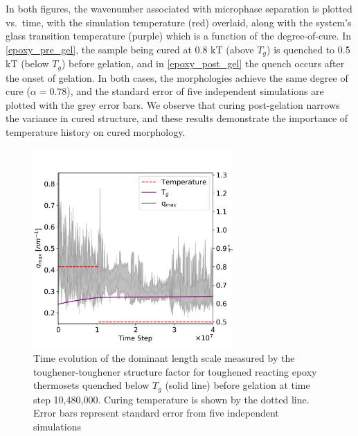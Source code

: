 In both figures, the wavenumber associated with microphase separation is plotted vs.~time, with the simulation temperature (red) overlaid, along with the system's glass transition temperature (purple) which is a function of the degree-of-cure. 
In \autoref{epoxy_pre_gel}, the sample being cured at 0.8 kT (above $T_g$) is quenched to 0.5 kT (below $T_g$) before gelation, and in \autoref{epoxy_post_gel} the quench occurs after the onset of gelation. 
In both cases, the morphologies achieve the same degree of cure ($\alpha=0.78$), and the standard error of five independent simulations are plotted with the grey error bars. 
We observe that curing post-gelation narrows the variance in cured structure, and these results demonstrate the importance of temperature history on cured morphology.

\begin{figure}
    \centering
    \includegraphics[width=3in]{figures/pub4/epoxy_pre_gel.png}
    \caption{Time evolution of the dominant length scale measured by the toughener-toughener structure factor for toughened reacting epoxy thermosets quenched below $T_g$ (solid line) before gelation at time step 10,480,000. Curing temperature is shown by the dotted line. Error bars represent standard error from five independent simulations}
    \label{epoxy_pre_gel} %
\end{figure}

